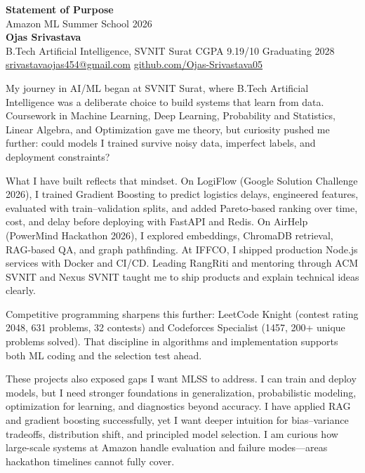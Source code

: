 \documentclass[a4paper,11pt]{article}
\begin{document}
\begin{center}
{\LARGE \textbf{Statement of Purpose}} \\[2mm]
{\large Amazon ML Summer School 2026} \\[4mm]
\textbf{Ojas Srivastava} \\
B.Tech Artificial Intelligence, SVNIT Surat \textbar{} CGPA 9.19/10 \textbar{} Graduating 2028 \\
\href{mailto:srivastavaojas454@gmail.com}{srivastavaojas454@gmail.com} \textbar{}
\href{https://github.com/Ojas-Srivastava05}{github.com/Ojas-Srivastava05}
\end{center}

\vspace{2mm}

My journey in AI/ML began at SVNIT Surat, where B.Tech Artificial Intelligence was a deliberate choice to build systems that learn from data. Coursework in Machine Learning, Deep Learning, Probability and Statistics, Linear Algebra, and Optimization gave me theory, but curiosity pushed me further: could models I trained survive noisy data, imperfect labels, and deployment constraints?

What I have built reflects that mindset. On LogiFlow (Google Solution Challenge 2026), I trained Gradient Boosting to predict logistics delays, engineered features, evaluated with train--validation splits, and added Pareto-based ranking over time, cost, and delay before deploying with FastAPI and Redis. On AirHelp (PowerMind Hackathon 2026), I explored embeddings, ChromaDB retrieval, RAG-based QA, and graph pathfinding. At IFFCO, I shipped production Node.js services with Docker and CI/CD. Leading RangRiti and mentoring through ACM SVNIT and Nexus SVNIT taught me to ship products and explain technical ideas clearly.

Competitive programming sharpens this further: LeetCode Knight (contest rating 2048, 631 problems, 32 contests) and Codeforces Specialist (1457, 200+ unique problems solved). That discipline in algorithms and implementation supports both ML coding and the selection test ahead.

These projects also exposed gaps I want MLSS to address. I can train and deploy models, but I need stronger foundations in generalization, probabilistic modeling, optimization for learning, and diagnostics beyond accuracy. I have applied RAG and gradient boosting successfully, yet I want deeper intuition for bias--variance tradeoffs, distribution shift, and principled model selection. I am curious how large-scale systems at Amazon handle evaluation and failure modes---areas hackathon timelines cannot fully cover.
\end{document}
